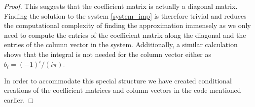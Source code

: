 \begin{proof}
  This suggests that the coefficient matrix is actually a diagonal matrix. Finding
  the solution to the system \eqref{system_imp} is therefore trivial and reduces
  the computational complexity of finding the approximation immensely as we only need
  to compute the entries of the coefficient matrix along the diagonal and the entries
  of the column vector in the system. Additionally, a similar calculation shows
  that the integral is not needed for the column vector either as $b_i = (-1)^i / (i\pi)$.

  In order to accommodate this special structure we have created conditional creations
  of the coefficient matrices and column vectors in the code mentioned earlier.
\end{proof}
